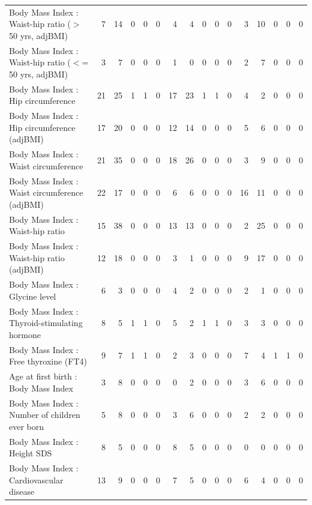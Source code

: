 \begin{table}[ht]
\begin{tabular}{lrrrrrrrrrrrrrrr}
  Body Mass Index  : Waist-hip ratio ($>$ 50 yrs, adjBMI) &   7 &  14 &   0 &   0 &   0 &   4 &   4 &   0 &   0 &   0 &   3 &  10 &   0 &   0 &   0 \\ 
  Body Mass Index  : Waist-hip ratio ($<$= 50 yrs, adjBMI) &   3 &   7 &   0 &   0 &   0 &   1 &   0 &   0 &   0 &   0 &   2 &   7 &   0 &   0 &   0 \\ 
  Body Mass Index  : Hip circumference  &  21 &  25 &   1 &   1 &   0 &  17 &  23 &   1 &   1 &   0 &   4 &   2 &   0 &   0 &   0 \\ 
  Body Mass Index  : Hip circumference (adjBMI) &  17 &  20 &   0 &   0 &   0 &  12 &  14 &   0 &   0 &   0 &   5 &   6 &   0 &   0 &   0 \\ 
  Body Mass Index  : Waist circumference  &  21 &  35 &   0 &   0 &   0 &  18 &  26 &   0 &   0 &   0 &   3 &   9 &   0 &   0 &   0 \\ 
  Body Mass Index  : Waist circumference (adjBMI) &  22 &  17 &   0 &   0 &   0 &   6 &   6 &   0 &   0 &   0 &  16 &  11 &   0 &   0 &   0 \\ 
  Body Mass Index  : Waist-hip ratio  &  15 &  38 &   0 &   0 &   0 &  13 &  13 &   0 &   0 &   0 &   2 &  25 &   0 &   0 &   0 \\ 
  Body Mass Index  : Waist-hip ratio (adjBMI) &  12 &  18 &   0 &   0 &   0 &   3 &   1 &   0 &   0 &   0 &   9 &  17 &   0 &   0 &   0 \\ 
  Body Mass Index  : Glycine level  &   6 &   3 &   0 &   0 &   0 &   4 &   2 &   0 &   0 &   0 &   2 &   1 &   0 &   0 &   0 \\ 
  Body Mass Index  : Thyroid-stimulating hormone  &   8 &   5 &   1 &   1 &   0 &   5 &   2 &   1 &   1 &   0 &   3 &   3 &   0 &   0 &   0 \\ 
  Body Mass Index  : Free thyroxine (FT4) &   9 &   7 &   1 &   1 &   0 &   2 &   3 &   0 &   0 &   0 &   7 &   4 &   1 &   1 &   0 \\ 
  Age at first birth  : Body Mass Index  &   3 &   8 &   0 &   0 &   0 &   0 &   2 &   0 &   0 &   0 &   3 &   6 &   0 &   0 &   0 \\ 
  Body Mass Index  : Number of children ever born  &   5 &   8 &   0 &   0 &   0 &   3 &   6 &   0 &   0 &   0 &   2 &   2 &   0 &   0 &   0 \\ 
  Body Mass Index  : Height SDS &   8 &   5 &   0 &   0 &   0 &   8 &   5 &   0 &   0 &   0 &   0 &   0 &   0 &   0 &   0 \\ 
  Body Mass Index  : Cardiovascular disease &  13 &   9 &   0 &   0 &   0 &   7 &   5 &   0 &   0 &   0 &   6 &   4 &   0 &   0 &   0 \\ 

\end{tabular}
\end{table}
